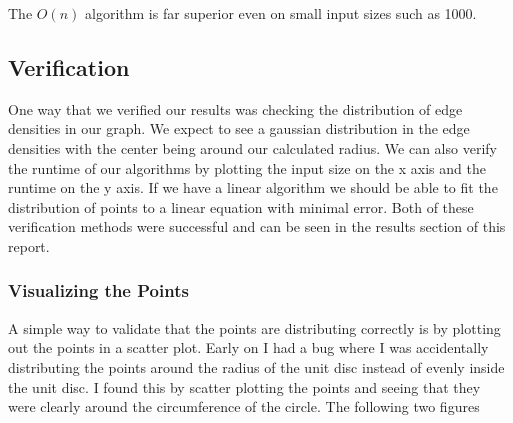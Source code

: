 \documentclass{article}
\begin{document}
	  The $O(n)$ algorithm is far superior even on small input sizes such as 1000.
	\subsection{Verification}
		One way that we verified our results was checking the distribution of edge densities in our graph.
		We expect to see a gaussian distribution in the edge densities with the center being around our calculated radius.
		We can also verify the runtime of our algorithms by plotting the input size on the x axis and the runtime on the y axis.
		If we have a linear algorithm we should be able to fit the distribution of points to a linear equation with minimal error.
		Both of these verification methods were successful and can be seen in the results section of this report.

  \subsubsection{Visualizing the Points}
    A simple way to validate that the points are distributing correctly is by plotting out the points in a scatter plot.
    Early on I had a bug where I was accidentally distributing the points around the radius of the unit disc instead of evenly inside the unit disc.
    I found this by scatter plotting the points and seeing that they were clearly around the circumference of the circle.
    The following two figures
\end{document}
